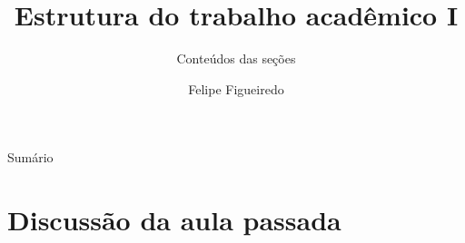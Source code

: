 \documentclass{beamer}
\title%
{Estrutura do trabalho acadêmico I}
\subtitle
{Conteúdos das seções} %
\author%
{Felipe Figueiredo}%
\institute[INTO] %
{Instituto Nacional de Traumatologia e Ortopedia
}
\date%
{}
\begin{document}
\begin{frame}
  \titlepage
\end{frame}

\begin{frame}{Sumário}
  \tableofcontents
\end{frame}








\section{Discussão da aula passada}
\end{document}
